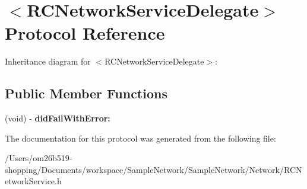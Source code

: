 \hypertarget{protocol_r_c_network_service_delegate-p}{\section{$<$R\-C\-Network\-Service\-Delegate$>$ Protocol Reference}
\label{protocol_r_c_network_service_delegate-p}
}


Inheritance diagram for $<$R\-C\-Network\-Service\-Delegate$>$\-:
\subsection*{Public Member Functions}
\begin{DoxyCompactItemize}
\item 
\hypertarget{protocol_r_c_network_service_delegate-p_a09af74927d9afcdbde11c079eb2ab4f4}{(void) -\/ {\bfseries did\-Fail\-With\-Error\-:}}\label{protocol_r_c_network_service_delegate-p_a09af74927d9afcdbde11c079eb2ab4f4}

\end{DoxyCompactItemize}


The documentation for this protocol was generated from the following file\-:\begin{DoxyCompactItemize}
\item 
/\-Users/om26b519-\/shopping/\-Documents/workspace/\-Sample\-Network/\-Sample\-Network/\-Network/R\-C\-Network\-Service.\-h\end{DoxyCompactItemize}
